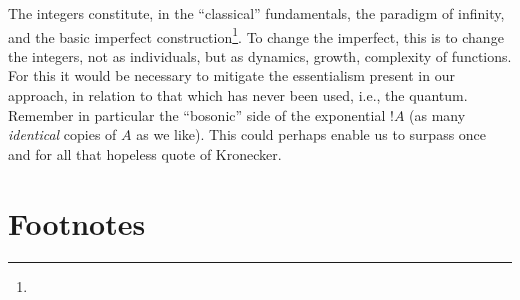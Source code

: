 \documentclass{article}
\begin{document}
The integers constitute, in the \enquote{classical} fundamentals, the paradigm of infinity, and the basic imperfect construction\footnote{}. To change the imperfect, this is to change the integers, not as individuals, but as dynamics, growth, complexity of functions. For this it would be necessary to mitigate the essentialism present in our approach, in relation to that which has never been used, i.e., the quantum. Remember in particular the \enquote{bosonic} side of the exponential $!A$ (as many \emph{identical} copies of $A$ as we like). This could perhaps enable us to surpass once and for all that hopeless quote of Kronecker.

\section*{Footnotes}
\end{document}
